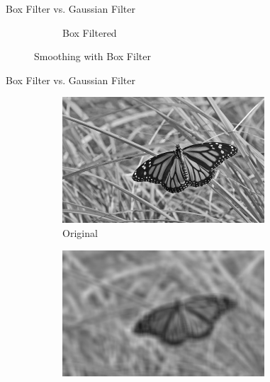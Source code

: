 \begin{frame}{Box Filter vs. Gaussian Filter}
\begin{figure}
\begin{subfigure}[b]{0.3\textwidth}
            \caption{Box Filtered}
            \label{sfi:box_vs_gaussian_box}
        \end{subfigure}
        \caption{Smoothing with Box Filter}\label{fi:smoothing_with_box}
    \end{figure}
\end{frame}

\begin{frame}{Box Filter vs. Gaussian Filter}
    \begin{figure}
        \centering
        \begin{subfigure}[b]{0.3\textwidth}
            \includegraphics[width=\textwidth]{./figures/box_vs_gaussian_original.jpg}
            \caption{Original}
            \label{sfi:box_vs_gaussian_original}
        \end{subfigure}
        \begin{subfigure}[b]{0.3\textwidth}
            \includegraphics[width=\textwidth]{./figures/box_vs_gaussian_box.jpg}

\end{subfigure}
\end{figure}
\end{frame}
